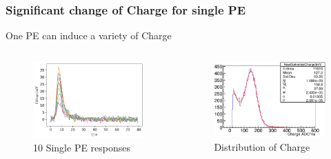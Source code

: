 \documentclass{beamer}
\begin{document}
\begin{frame}
\frametitle{Significant change of Charge for single PE}
\hspace{8mm}One PE can induce a variety of Charge
\begin{columns}
\begin{figure}
    \centering
    \caption{10 Single PE responses}
    \includegraphics[width=1.0\linewidth]{img/spewaves.png}
\end{figure}
\begin{figure}
    \centering
    \caption{Distribution of Charge}
    \includegraphics[width=1.0\linewidth]{img/chargehist.png}
\end{figure}
\end{columns}
\end{frame}
\end{document}
